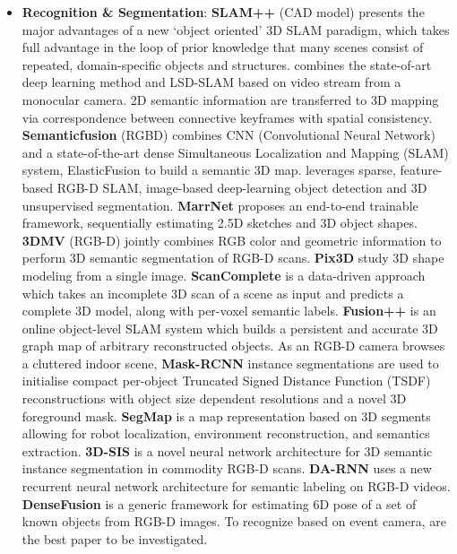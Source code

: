 \documentclass[journal,transmag]{IEEEtran}
\begin{document}
\begin{itemize}
    \item \textbf{Recognition \& Segmentation}: \textbf{SLAM++} (CAD model) \cite{Salas2013SLAM} presents the major advantages of a new ‘object oriented’ 3D SLAM paradigm, which takes full advantage in the loop of prior knowledge that many scenes consist of repeated, domain-specific objects and structures. \cite{Li2016Semi} combines the state-of-art deep learning method and LSD-SLAM based on video stream from a monocular camera. 2D semantic information are transferred to 3D mapping via correspondence between connective keyframes with spatial consistency. \textbf{Semanticfusion} (RGBD) \cite{mccormac2017semanticfusion} combines CNN (Convolutional Neural Network) and a state-of-the-art dense Simultaneous Localization and Mapping (SLAM) system, ElasticFusion \cite{whelan2016elasticfusion} to build a semantic 3D map. \cite{sunderhauf2017meaningful} leverages sparse, feature-based RGB-D SLAM, image-based deep-learning object detection and 3D unsupervised segmentation. \textbf{MarrNet} \cite{wu2017marrnet} proposes an end-to-end trainable framework, sequentially estimating 2.5D sketches and 3D object shapes. \textbf{3DMV} (RGB-D) \cite{dai20183dmv} jointly combines RGB color and geometric information to perform 3D semantic segmentation of RGB-D scans. \textbf{Pix3D} \cite{pix3d} study 3D shape modeling from a single image. \textbf{ScanComplete} \cite{dai2018scancomplete} is a data-driven approach which takes an incomplete 3D scan of a scene as input and predicts a complete 3D model, along with per-voxel semantic labels. \textbf{Fusion++} \cite{McCormac2018FusionVO} is an online object-level SLAM system which builds a persistent and accurate 3D graph map of arbitrary reconstructed objects. As an RGB-D camera browses a cluttered indoor scene, \textbf{Mask-RCNN} instance segmentations are used to initialise compact per-object Truncated Signed Distance Function (TSDF) reconstructions with object size dependent resolutions and a novel 3D foreground mask. \textbf{SegMap} \cite{dube2018segmap} is a map representation based on 3D segments allowing for robot localization, environment reconstruction, and semantics extraction. \textbf{3D-SIS} \cite{hou20193d} is a novel neural network architecture for 3D semantic instance segmentation in commodity RGB-D scans. \textbf{DA-RNN} \cite{xiang2017rnn} uses a new recurrent neural network architecture for semantic labeling on RGB-D videos. \textbf{DenseFusion} \cite{wang2019densefusion} is a generic framework for estimating 6D pose of a set of known objects from RGB-D images. To recognize based on event camera, \cite{stromatias2017event}\cite{maro2018event}\cite{afshar2018investigation}\cite{linares2019dynamic} are the best paper to be investigated.

\end{itemize}
\end{document}
